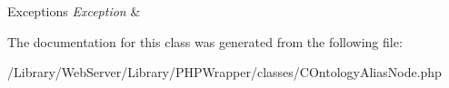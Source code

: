 \begin{DoxyExceptions}{Exceptions}
{\em Exception} & \\
\hline
\end{DoxyExceptions}


The documentation for this class was generated from the following file\-:\begin{DoxyCompactItemize}
\item 
/\-Library/\-Web\-Server/\-Library/\-P\-H\-P\-Wrapper/classes/C\-Ontology\-Alias\-Node.\-php\end{DoxyCompactItemize}
